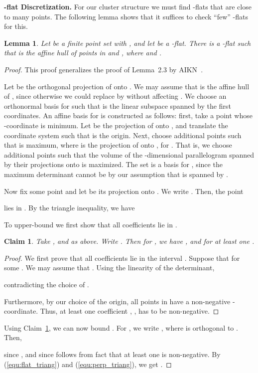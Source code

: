\documentclass[a4paper,11pt]{paper}
\newtheorem{lemma}[theorem]{Lemma}
\newtheorem{claim}[theorem]{Claim}
\begin{document}
\noindent
\textbf{-flat Discretization.}
For our cluster structure we must find -flats that are
close to many points. The following lemma shows that it
suffices to check ``few'' -flats for this.
\begin{lemma}\label{lem:pert}
  Let  be a finite point set with ,
  and let  be a -flat. There is a -flat 
  such that  is the affine hull of  points in  and
  ,
  where  and
  .
\end{lemma}
\begin{proof}
  This proof generalizes the proof of Lemma~2.3 by
  AIKN~\cite{AndoniInKrNg09}.

  Let  be the orthogonal projection of  onto .
  We may assume that  is the affine hull of , since otherwise
  we could replace  by  without affecting
  . We choose an orthonormal basis for  such that
   is the linear subspace spanned by the first  coordinates.
  An affine basis for  is constructed as follows: first,
  take a point  whose -coordinate is minimum. Let
   be the projection of  onto , and translate the
  coordinate system such that  is the origin.
  Next, choose  additional points  such
  that  is maximum, where  is
  the projection of  onto , for . That is,
  we choose  additional points such that the volume of the
  -dimensional parallelogram spanned by their projections
  onto  is maximized. The set  is a basis for
  , since the maximum determinant cannot be  by our assumption
  that  is spanned by .

  Now fix some point  and let  be its projection onto
  . We write . Then, the point
  
  lies in . By the triangle inequality, we have
  
  To upper-bound  we first show that all coefficients
   lie in .
  \begin{claim}\label{clm:coeffbound}
    Take ,   and 
    as above. Write . Then for
    , we have , and
     for at least one  .
  \end{claim}
  \begin{proof}
    We first prove that all coefficients  lie in the
    interval . Suppose that  for some
    . We may assume that .
    Using the linearity of the determinant,
    
     contradicting the choice of .

     Furthermore, by our choice of the origin,
     all points in  have a non-negative
     -coordinate.
     Thus, at least one coefficient , ,
     has to be non-negative.
  \end{proof}
  Using Claim~\ref{clm:coeffbound}, we can now bound .
  For , we write
  , where  is orthogonal to .
  Then,
  
  since
  ,
  and since  follows from
  fact that at least one  is non-negative.
  By (\ref{equ:flat_triang}) and (\ref{equ:perp_triang}), we get
  .
\end{proof}
\end{document}
